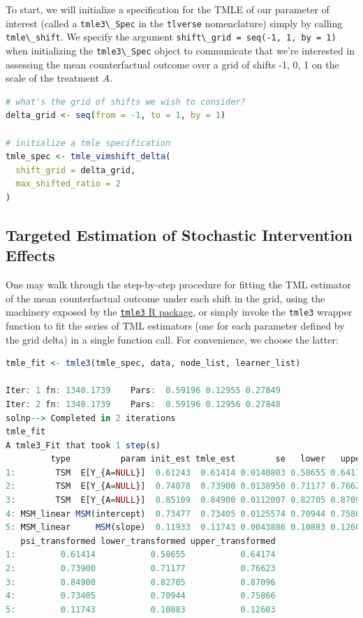 \documentclass[
  12pt, krantz2,
]{book}
\newcommand{\passthrough}[1]{#1}
\theoremstyle{definition}
\theoremstyle{definition}
\theoremstyle{definition}
\newcommand{\1}{\mathbbm{1}}
\begin{document}
To start, we will initialize a specification for the TMLE of our parameter of
interest (called a \passthrough{\lstinline!tmle3\_Spec!} in the \passthrough{\lstinline!tlverse!} nomenclature) simply by calling
\passthrough{\lstinline!tmle\_shift!}. We specify the argument \passthrough{\lstinline!shift\_grid = seq(-1, 1, by = 1)!}
when initializing the \passthrough{\lstinline!tmle3\_Spec!} object to communicate that we're interested
in assessing the mean counterfactual outcome over a grid of shifts -1, 0, 1 on the scale of the treatment \(A\).

\begin{lstlisting}[language=R]
# what's the grid of shifts we wish to consider?
delta_grid <- seq(from = -1, to = 1, by = 1)

# initialize a tmle specification
tmle_spec <- tmle_vimshift_delta(
  shift_grid = delta_grid,
  max_shifted_ratio = 2
)
\end{lstlisting}

\hypertarget{targeted-estimation-of-stochastic-intervention-effects}{%
\subsection{Targeted Estimation of Stochastic Intervention Effects}\label{targeted-estimation-of-stochastic-intervention-effects}}

One may walk through the step-by-step procedure for fitting the TML estimator
of the mean counterfactual outcome under each shift in the grid, using the
machinery exposed by the \href{https://tlverse.org/tmle3}{\passthrough{\lstinline!tmle3!} R package}, or
simply invoke the \passthrough{\lstinline!tmle3!} wrapper function to fit the series of TML estimators
(one for each parameter defined by the grid delta) in a single function call.
For convenience, we choose the latter:

\begin{lstlisting}[language=R]
tmle_fit <- tmle3(tmle_spec, data, node_list, learner_list)

Iter: 1 fn: 1340.1739    Pars:  0.59196 0.12955 0.27849
Iter: 2 fn: 1340.1739    Pars:  0.59196 0.12956 0.27848
solnp--> Completed in 2 iterations
tmle_fit
A tmle3_Fit that took 1 step(s)
         type          param init_est tmle_est        se   lower   upper
1:        TSM  E[Y_{A=NULL}]  0.61243  0.61414 0.0140803 0.58655 0.64174
2:        TSM  E[Y_{A=NULL}]  0.74078  0.73900 0.0138950 0.71177 0.76623
3:        TSM  E[Y_{A=NULL}]  0.85109  0.84900 0.0112007 0.82705 0.87096
4: MSM_linear MSM(intercept)  0.73477  0.73405 0.0125574 0.70944 0.75866
5: MSM_linear     MSM(slope)  0.11933  0.11743 0.0043886 0.10883 0.12603
   psi_transformed lower_transformed upper_transformed
1:         0.61414           0.58655           0.64174
2:         0.73900           0.71177           0.76623
3:         0.84900           0.82705           0.87096
4:         0.73405           0.70944           0.75866
5:         0.11743           0.10883           0.12603
\end{lstlisting}
\end{document}
